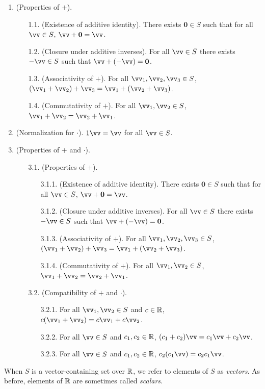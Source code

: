 \begin{defn}
    \begin{enumerate}
        \item (Properties of $+$).
        \begin{enumerate}
                \item[1.1.] (Existence of additive identity). There exists $\mathbf{0} \in S$ such that for all $\vv \in S$, $\vv + \mathbf{0} = \vv$.
                \item[1.2.] (Closure under additive inverses). For all $\vv \in S$ there exists $-\vv \in S$ such that $\vv + (-\vv) = \mathbf{0}$.
                \item[1.3.] (Associativity of $+$). For all $\vv_1, \vv_2, \vv_3 \in S$, $(\vv_1 + \vv_2) + \vv_3 = \vv_1 + (\vv_2 + \vv_3)$.
                \item[1.4.] (Commutativity of $+$). For all $\vv_1, \vv_2 \in S$, $\vv_1 + \vv_2 = \vv_2 + \vv_1$.
            \end{enumerate}
        \item (Normalization for $\cdot$). $1 \vv = \vv$ for all $\vv \in S$.
        \item (Properties of $+$ and $\cdot$).
        \begin{enumerate}
            \item[3.1.] (Properties of $+$).
            \begin{enumerate}
                \item[3.1.1.] (Existence of additive identity). There exists $\mathbf{0} \in S$ such that for all $\vv \in S$, $\vv + \mathbf{0} = \vv$.
                \item[3.1.2.] (Closure under additive inverses). For all $\vv \in S$ there exists $-\vv \in S$ such that $\vv + (-\vv) = \mathbf{0}$.
                \item[3.1.3.] (Associativity of $+$). For all $\vv_1, \vv_2, \vv_3 \in S$, $(\vv_1 + \vv_2) + \vv_3 = \vv_1 + (\vv_2 + \vv_3)$.
                \item[3.1.4.] (Commutativity of $+$). For all $\vv_1, \vv_2 \in S$, $\vv_1 + \vv_2 = \vv_2 + \vv_1$.
            \end{enumerate}
            \item[3.2.] (Compatibility of $+$ and $\cdot$).
            \begin{enumerate}
                \item[3.2.1.] For all $\vv_1, \vv_2 \in S$ and $c \in \mathbb{R}$, $c(\vv_1 + \vv_2) = c \vv_1 + c \vv_2$.
                \item[3.2.2.] For all $\vv \in S$ and $c_1, c_2 \in \mathbb{R}$, $(c_1 + c_2)\vv = c_1 \vv + c_2 \vv$.
                \item[3.2.3.] For all $\vv \in S$ and $c_1, c_2 \in \mathbb{R}$, $c_2 (c_1 \vv) = c_2 c_1 \vv$.
            \end{enumerate}
        \end{enumerate}
    \end{enumerate}
    
    When $S$ is a vector-containing set over $\mathbb{R}$, we refer to elements of $S$ as \textit{vectors}. As before, elements of $\mathbb{R}$ are sometimes called \textit{scalars}.
\end{defn}

